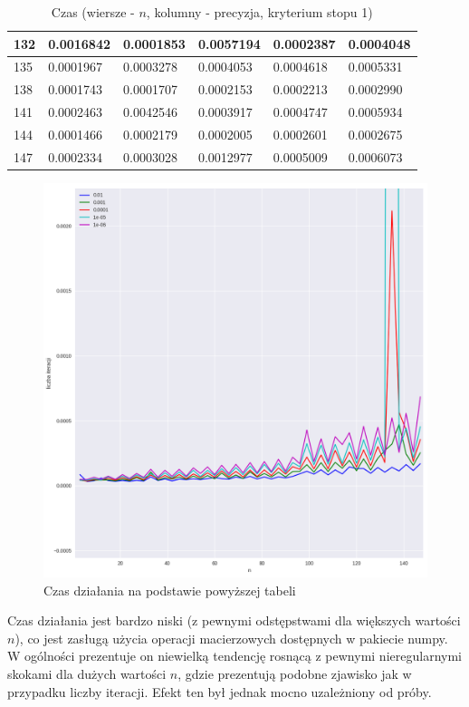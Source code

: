 \documentclass{article}
\begin{document}
\begin{table}[H]
\begin{tabular}{|l|l|l|l|l|l|}
132 & 0.0016842 & 0.0001853 & 0.0057194 & 0.0002387 & 0.0004048 \\ \hline
135 & 0.0001967 & 0.0003278 & 0.0004053 & 0.0004618 & 0.0005331 \\ \hline
138 & 0.0001743 & 0.0001707 & 0.0002153 & 0.0002213 & 0.0002990 \\ \hline
141 & 0.0002463 & 0.0042546 & 0.0003917 & 0.0004747 & 0.0005934 \\ \hline
144 & 0.0001466 & 0.0002179 & 0.0002005 & 0.0002601 & 0.0002675 \\ \hline
147 & 0.0002334 & 0.0003028 & 0.0012977 & 0.0005009 & 0.0006073 \\ \hline
\end{tabular}
\caption{Czas (wiersze - $n$, kolumny - precyzja, kryterium stopu 1)}
\end{table}

\begin{figure}[H]
    \centering
    \includegraphics[width=\textwidth]{img/plot_5.png}
    \caption{Czas działania na podstawie powyższej tabeli}
\end{figure}

Czas działania jest bardzo niski (z pewnymi odstępstwami dla większych wartości $n$), co jest zasługą użycia operacji
macierzowych dostępnych w pakiecie numpy. W ogólności prezentuje on niewielką tendencję rosnącą z pewnymi nieregularnymi
skokami dla dużych wartości $n$, gdzie prezentują podobne zjawisko jak w przypadku liczby iteracji. 
Efekt ten był jednak mocno uzależniony od próby.
\end{document}

